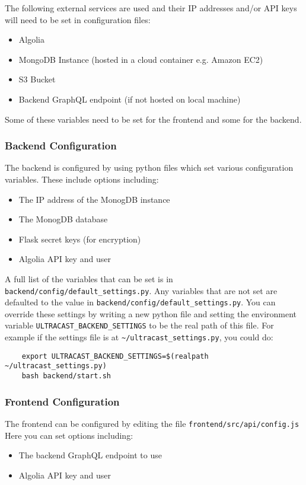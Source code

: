 \documentclass[../report.tex]{subfiles}
\begin{document}
The following external services are used and their IP addresses and/or API keys will need to be set in configuration files:

\begin{itemize}
    \item Algolia
    \item MongoDB Instance (hosted in a cloud container e.g. Amazon EC2)
    \item S3 Bucket
    \item Backend GraphQL endpoint (if not hosted on local machine)
\end{itemize}

Some of these variables need to be set for the frontend and some for the backend.

\subsubsection{Backend Configuration}

The backend is configured by using python files which set various configuration variables. These include options including:
\begin{itemize}
    \item The IP address of the MonogDB instance
    \item The MonogDB database
    \item Flask secret keys (for encryption)
    \item Algolia API key and user
\end{itemize}
A full list of the variables that can be set is in \verb|backend/config/default_settings.py|.
%
Any variables that are not set are defaulted to the value in \verb|backend/config/default_settings.py|.
You can override these settings by writing a new python file and setting the environment variable \verb|ULTRACAST_BACKEND_SETTINGS| to be the real path of this file. 
For example if the settings file is at \verb|~/ultracast_settings.py|, you could do:

\begin{verbatim}
    export ULTRACAST_BACKEND_SETTINGS=$(realpath ~/ultracast_settings.py)
    bash backend/start.sh
\end{verbatim}

\subsubsection{Frontend Configuration}

The frontend can be configured by editing the file \verb|frontend/src/api/config.js| Here you can set options including:
\begin{itemize}
    \item The backend GraphQL endpoint to use
    \item Algolia API key and user
\end{itemize}
\end{document}
